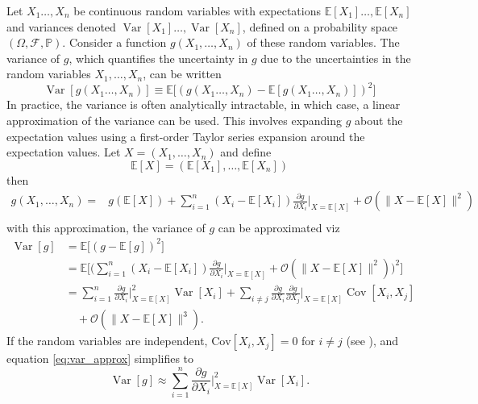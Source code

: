 \begin{definition}
	\label{def:error_propagation}
	Let $X_1 \ldots, X_n$ be continuous random variables with expectations $\mathbb{E}[X_1] \ldots, \mathbb{E}[X_n]$ and variances denoted $\operatorname{Var}[X_1] \ldots, \operatorname{Var}[X_n]$, defined on a probability space $(\Omega, \mathcal{F},\mathbb{P})$. Consider a function $g(X_1, \ldots, X_n)$ of these random variables. The variance of $g$, which quantifies the uncertainty in $g$ due to the uncertainties in the random variables $X_1, \ldots, X_n$, can be written
	\begin{equation}
			\operatorname{Var}[g(X_1 \ldots, X_n)] \equiv \mathbb{E}\big[(g(X_1 \ldots, X_n) - \mathbb{E}[g(X_1 \ldots, X_n)])^2\big] 
	\end{equation}
	In practice, the variance is often analytically intractable, in which case, a linear approximation of the variance can be used. This involves expanding $g$ about the expectation values using a first-order Taylor series expansion around the expectation values. Let $X = (X_1, \dots, X_n)$ and define 
	\begin{equation}
		 \mathbb{E}[X] = (\mathbb{E}[X_1], \dots, \mathbb{E}[X_n])
	\end{equation}
	then
	\begin{equation}
		\begin{split}
			g(X_1, \ldots, X_n) =& g(\mathbb{E}[X]) + \sum_{i=1}^n (X_i - \mathbb{E}[X_i]) \frac{\partial g}{\partial X_i} \bigg|_{X = \mathbb{E}[X]} + \mathcal{O}(\|X - \mathbb{E}[X]\|^2) \\
		\end{split}
		\label{e1}
	\end{equation}
	with this approximation, the variance of $g$ can be approximated viz
	\begin{equation}
		\begin{split}
			\operatorname{Var}[g] &= \mathbb{E}\big[(g - \mathbb{E}[g])^2\big] \\
			&= \mathbb{E}\bigg[\bigg( \sum_{i=1}^n (X_i - \mathbb{E}[X_i]) \frac{\partial g}{\partial X_i}\bigg|_{X=\mathbb{E}[X]} + \mathcal{O}(\|X - \mathbb{E}[X]\|^2)\bigg)^2\bigg] \\
			&= \sum_{i=1}^n  \frac{\partial g}{\partial X_i}\bigg|_{X = \mathbb{E}[X]}^2\operatorname{Var}[X_i] + \sum_{i \neq j} \frac{\partial g}{\partial X_i} \frac{\partial g}{\partial X_j}\bigg|_{X=\mathbb{E}[X]} \operatorname{Cov}[X_i, X_j]\\
			&\quad + \mathcal{O}(\|X - \mathbb{E}[X]\|^3).
		\end{split}
	\label{eq:var_approx}
	\end{equation}
	If the random variables are independent, $\mathrm{Cov}[X_i, X_j] = 0$ for $i \neq j$ (see ), and equation \eqref{eq:var_approx} simplifies to
	\begin{equation}
		\operatorname{Var}[g] \approx \sum_{i=1}^n  \frac{\partial g}{\partial X_i}\bigg|_{X=\mathbb{E}[X]}^2\operatorname{Var}[X_i].
	\end{equation}
\end{definition}

